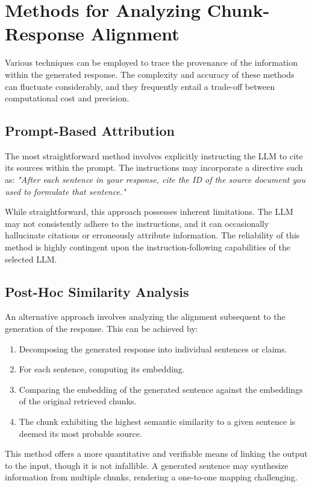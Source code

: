 \section{Methods for Analyzing Chunk-Response Alignment}
Various techniques can be employed to trace the provenance of the information within the generated response. The complexity and accuracy of these methods can fluctuate considerably, and they frequently entail a trade-off between computational cost and precision.

\subsection{Prompt-Based Attribution}
The most straightforward method involves explicitly instructing the LLM to cite its sources within the prompt. The instructions may incorporate a directive such as: \textit{"After each sentence in your response, cite the ID of the source document you used to formulate that sentence."} 

While straightforward, this approach possesses inherent limitations. The LLM may not consistently adhere to the instructions, and it can occasionally hallucinate citations or erroneously attribute information. The reliability of this method is highly contingent upon the instruction-following capabilities of the selected LLM.

\subsection{Post-Hoc Similarity Analysis}
An alternative approach involves analyzing the alignment subsequent to the generation of the response. This can be achieved by:
\begin{enumerate}
    \item Decomposing the generated response into individual sentences or claims.
    \item For each sentence, computing its embedding.
    \item Comparing the embedding of the generated sentence against the embeddings of the original retrieved chunks.
    \item The chunk exhibiting the highest semantic similarity to a given sentence is deemed its most probable source.
\end{enumerate}
This method offers a more quantitative and verifiable means of linking the output to the input, though it is not infallible. A generated sentence may synthesize information from multiple chunks, rendering a one-to-one mapping challenging.

